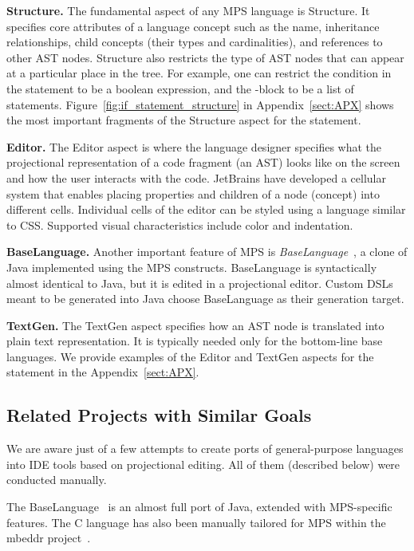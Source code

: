 \noindent\textbf{Structure.}
The fundamental aspect of any MPS language is Structure.
It specifies core attributes of a language concept such as the name, inheritance relationships, child concepts (their types and cardinalities), and references to other AST nodes.
Structure also restricts the type of AST nodes that can appear at a particular place in the tree.
For example, one can restrict the condition in the  statement to be a boolean expression, and the -block to be a list of statements.
Figure~\ref{fig:if_statement_structure} in Appendix~\ref{sect:APX} shows the most important fragments of the Structure aspect for the  statement.

\noindent\textbf{Editor.}
The Editor aspect is where the language designer specifies what the projectional representation of a code fragment (an AST) looks like on the screen and how the user interacts with the code.
JetBrains have developed a cellular system that enables placing properties and children of a node (concept) into different cells.
Individual cells of the editor can be styled using a language similar to CSS.
Supported visual characteristics include color and indentation.

\noindent\textbf{BaseLanguage.}
Another important feature of MPS is \emph{BaseLanguage}~\cite{ref:BASELANG}, a clone of Java implemented using the MPS constructs.
BaseLanguage is syntactically almost identical to Java, but it is edited in a projectional editor.
Custom DSLs meant to be generated into Java choose BaseLanguage as their generation target.

\noindent\textbf{TextGen.}
The TextGen aspect specifies how an AST node is translated into plain text representation.
It is typically needed only for the bottom-line base languages.
We provide examples of the Editor and TextGen aspects for the  statement in the Appendix~\ref{sect:APX}.

\subsection{Related Projects with Similar Goals}
\label{sect:RELATED}

We are aware just of a few attempts to create ports of general-purpose languages into IDE tools based on projectional editing.
All of them (described below) were conducted manually.

The BaseLanguage~\cite{ref:BASELANG} is an almost full port of Java, extended with MPS-specific features.
The C language has also been manually tailored for MPS within the mbeddr project~\cite{ref:MBEDDR}.

